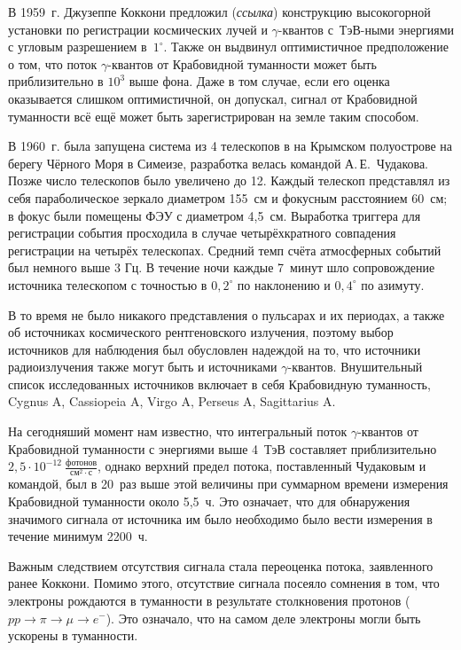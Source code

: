 \documentclass[magd,floatypics,numeref]{msudipl} %
\begin{document}
В 1959~г. Джузеппе Коккони предложил  (\textit{ссылка}) конструкцию высокогорной установки по регистрации космических лучей и $\gamma$-квантов с~ТэВ-ными энергиями с угловым разрешением в~$1^\circ$. Также он выдвинул оптимистичное предположение о том, что поток $\gamma$-квантов от Крабовидной туманности может быть приблизительно в $10^3$  выше фона. Даже в том случае, если его оценка оказывается слишком оптимистичной, он допускал, сигнал от Крабовидной туманности всё ещё может быть зарегистрирован на земле таким способом. 

В 1960~г. была запущена система из 4 телескопов в на Крымском полуострове на берегу Чёрного Моря в Симеизе, разработка велась командой А.\,Е.~Чудакова. Позже число телескопов было увеличено до 12. Каждый телескоп представлял из себя параболическое зеркало диаметром 155~см и фокусным расстоянием 60~см; в фокус были помещены ФЭУ с диаметром 4,5~см. Выработка триггера для регистрации события просходила в случае четырёхкратного совпадения регистрации на четырёх телескопах. Средний темп счёта атмосферных событий был немного выше  3 Гц. В течение ночи каждые 7~минут шло сопровождение источника телескопом с точностью в $0,2^{\circ}$ по наклонению и $0,4^{\circ}$ по азимуту.

В то время не было никакого представления о пульсарах и их периодах, а также об источниках космического рентгеновского излучения, поэтому выбор источников для наблюдения был обусловлен надеждой на то, что источники радиоизлучения также могут быть и источниками $\gamma$-квантов. Внушительный список исследованных источников включает в себя Крабовидную туманность, Cygnus A, Cassiopeia A, Virgo A, Perseus A, Sagittarius A. 

На сегодняший момент нам известно, что интегральный поток $\gamma$-квантов от Крабовидной туманности с энергиями выше 4~ТэВ составляет приблизительно~$2,5\cdot10^{-12}~\frac{\text{фотонов}}{\text{см}^2\cdot\text{с}}$, однако верхний предел потока, поставленный Чудаковым и командой, был в 20~раз выше этой величины при суммарном времени измерения Крабовидной туманности около 5,5~ч. Это означает, что для обнаружения значимого сигнала от источника им было необходимо было вести измерения в течение минимум 2200~ч.

Важным следствием отсутствия сигнала стала переоценка потока, заявленного ранее Коккони. Помимо этого, отсутствие сигнала посеяло сомнения в том, что электроны рождаются в туманности в результате столкновения протонов ($pp \rightarrow\pi\rightarrow\mu\rightarrow e^-$). Это означало, что на самом деле электроны могли быть ускорены в туманности. 
\end{document}
